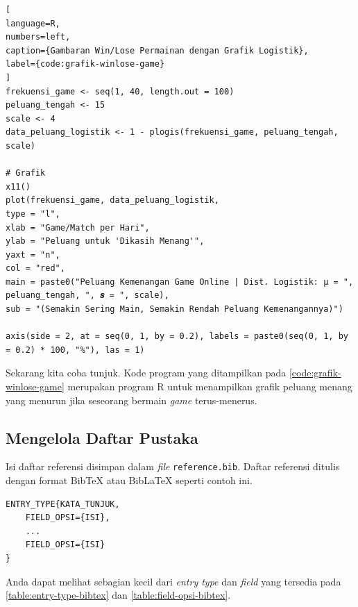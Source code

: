 \begin{enumerate}[]
\begin{lstlisting}[
language=R, 
numbers=left,
caption={Gambaran Win/Lose Permainan dengan Grafik Logistik},
label={code:grafik-winlose-game}
]
frekuensi_game <- seq(1, 40, length.out = 100)
peluang_tengah <- 15
scale <- 4
data_peluang_logistik <- 1 - plogis(frekuensi_game, peluang_tengah, scale)

# Grafik
x11()
plot(frekuensi_game, data_peluang_logistik,
type = "l",
xlab = "Game/Match per Hari",
ylab = "Peluang untuk 'Dikasih Menang'",
yaxt = "n",
col = "red",
main = paste0("Peluang Kemenangan Game Online | Dist. Logistik: μ = ", peluang_tengah, ", 𝒔 = ", scale),
sub = "(Semakin Sering Main, Semakin Rendah Peluang Kemenangannya)")

axis(side = 2, at = seq(0, 1, by = 0.2), labels = paste0(seq(0, 1, by = 0.2) * 100, "%"), las = 1)
    \end{lstlisting}
    
    Sekarang kita coba tunjuk. Kode program yang ditampilkan pada \autoref{code:grafik-winlose-game} merupakan program R untuk menampilkan grafik peluang menang yang menurun jika seseorang bermain \textit{game} terus-menerus.
\end{enumerate}

\subsection{Mengelola Daftar Pustaka}

Isi daftar referensi disimpan dalam \textit{file} \texttt{reference.bib}. Daftar referensi ditulis dengan format BibTeX atau BibLaTeX seperti contoh ini.

\begin{lstlisting}
ENTRY_TYPE{KATA_TUNJUK,
    FIELD_OPSI={ISI},
    ...
    FIELD_OPSI={ISI}
}
\end{lstlisting}

Anda dapat melihat sebagian kecil dari \textit{entry type} dan \textit{field} yang tersedia pada \autoref{table:entry-type-bibtex} dan \autoref{table:field-opsi-bibtex}.

